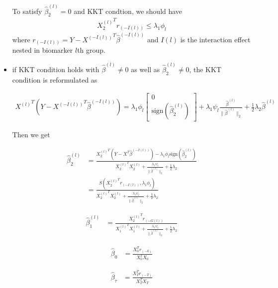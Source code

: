 \documentclass[12pt]{article}
\begin{document}
\begin{itemize}
To satisfy $\hat{\beta}_2^{(l)}=0$ and KKT condtion, we should have
\begin{align}
 {X_2^{(l)}}^T r_{(-I(l))}\leq \lambda_1\phi_l  
\end{align}
where $r_{(-I(l))}=Y- {X^{(-I(l))}}^T \hat{\beta}^{(-I(l))}$ and $I(l)$ is the interaction effect
nested in biomarker $l$th group.


\item if KKT condition holds with $\hat{\beta}^{(l)}\neq 0$ as well as $\hat{\beta}_2^{(l)}\neq 0$, the KKT condition is reformulated as

\begin{align}
  {X^{(l)}}^T(Y-  {X^{(-I(l))}}^T \hat{\beta}^{(-I(l))})=\lambda_1\phi_l \begin{bmatrix}
    0 \\
    \text{sign}(\hat{\beta}_2^{(l)})
  \end{bmatrix}
  + \lambda_1\psi_l \frac{\hat{\beta}^{(l)}}{\parallel \hat{\beta}^{(l)} \parallel_2 } +\frac{1}{2}\lambda_2\hat{\beta}^{(l)}
\end{align}

Then we get

\begin{equation} 
  \begin{split}
  \hat{\beta}_2^{(l)} & =\frac{ {X_2^{(l)}}^T (Y-X^T\hat{\beta}^{(-I(l))})-\lambda_1\phi_l\text{sign}(\hat{\beta}_2^{(l)})}{{X_2^{(l)}}^TX_2^{(l)}+\frac{\lambda_1\psi_l}{\parallel \hat{\beta}^{(l)} \parallel_2} + \frac{1}{2}\lambda_2} \\
  & = \frac{ S( {X_2^{(l)}}^Tr_{(-I(l))}, \lambda_1\phi_l ) }{ {X_2^{(l)}}^TX_2^{(l)}+\frac{\lambda_1\psi_l}{\parallel \hat{\beta}^{(l)} \parallel_2} + \frac{1}{2}\lambda_2 } 
\end{split}
\end{equation}
  
  \begin{equation} 
    \begin{split}
  \hat{\beta}_1^{(l)} & =  \frac{ {X_2^{(l)}}^T r_{(-G(l))} }{ {X_1^{(l)}}^TX_1^{(l)}+\frac{\lambda_1\psi_l}{\parallel \hat{\beta}^{(l)} \parallel_2} + \frac{1}{2}\lambda_2 } 
\end{split}
\end{equation}
  
  \begin{equation} 
    \begin{split}
  \hat{\beta}_0 & = \frac{ X_0^T r_{(-0)} }{ X_0^TX_0 } 
\end{split}
\end{equation}
  
  \begin{equation} 
    \begin{split}
  \hat{\beta}_{\tau} & = \frac{ X_T^T r_{(-T)} }{ X_T^TX_T }
\end{split}
\end{equation}

\end{itemize}
\end{document}
